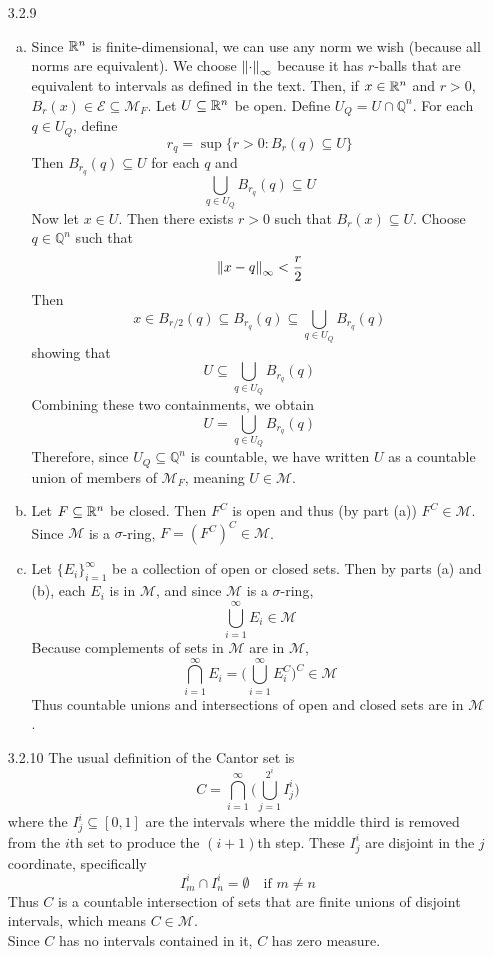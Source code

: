 \documentclass[../../Solutions.tex]{subfiles}
\begin{document}
\begin{itemize}
	\item [3.2.9]
	\begin{enumerate}[(a)]
		\item Since $\mathbb{R}^n$ is finite-dimensional, we can use any norm we wish (because all norms are equivalent).
			We choose $\left\lVert\cdot\right\rVert_\infty$ because it has $r$-balls that are equivalent to intervals as defined in the text.
			Then, if $x \in \mathbb{R}^n$ and $r > 0$, $B_r(x) \in \mathcal{E} \subseteq \mathcal{M}_F$.
			Let $U \subseteq \mathbb{R}^n$ be open.
			Define $U_Q = U\cap\mathbb{Q}^n$.
			For each $q \in U_Q$, define
			$$ r_q = \sup\{r > 0 : B_r(q) \subseteq U \} $$
			Then $B_{r_q}(q) \subseteq U$ for each $q$ and
			$$ \bigcup_{q \in U_Q} B_{r_q}(q) \subseteq U $$
			Now let $x \in U$.
			Then there exists $r > 0$ such that $B_r(x) \subseteq U$.
			Choose $q \in \mathbb{Q}^n$ such that
			$$ \left\lVert x-q\right\rVert_\infty < \frac{r}{2} $$
			Then
			$$ x \in B_{r/2}(q) \subseteq B_{r_q}(q) \subseteq \bigcup_{q \in U_Q} B_{r_q}(q) $$
			showing that
			$$ U \subseteq \bigcup_{q \in U_Q} B_{r_q}(q) $$
			Combining these two containments, we obtain
			$$ U = \bigcup_{q \in U_Q} B_{r_q}(q) $$
			Therefore, since $U_Q \subseteq \mathbb{Q}^n$ is countable, we have written $U$ as a countable union of members of $\mathcal{M}_F$, meaning $U \in \mathcal{M}$.
		\item Let $F \subseteq \mathbb{R}^n$ be closed.
			Then $F^C$ is open and thus (by part (a)) $F^C \in \mathcal{M}$.
			Since $\mathcal{M}$ is a $\sigma$-ring, $F = (F^C)^C \in \mathcal{M}$.
		\item Let $\{E_i\}_{i=1}^\infty$ be a collection of open or closed sets.
			Then by parts (a) and (b), each $E_i$ is in $\mathcal{M}$, and since $\mathcal{M}$ is a $\sigma$-ring,
			$$ \bigcup_{i=1}^\infty E_i \in \mathcal{M} $$
			Because complements of sets in $\mathcal{M}$ are in $\mathcal{M}$,
			$$ \bigcap_{i=1}^\infty E_i = \Big(\bigcup_{i=1}^\infty E_i^C\Big)^C \in \mathcal{M} $$
			Thus countable unions and intersections of open and closed sets are in $\mathcal{M}$.
	\end{enumerate}
	
	\item [3.2.10] The usual definition of the Cantor set is
		$$ C = \bigcap_{i=1}^\infty \Big( \bigcup_{j=1}^{2^i} I^i_j \Big) $$
		where the $I^i_j \subseteq [0,1]$ are the intervals where the middle third is removed from the $i$th set to produce the $(i+1)$th step.
		These $I^i_j$ are disjoint in the $j$ coordinate, specifically
		$$ I^i_m \cap I^i_n = \emptyset \quad\text{if } m \neq n $$
		Thus $C$ is a countable intersection of sets that are finite unions of disjoint intervals, which means $C \in \mathcal{M}$. \\
		Since $C$ has no intervals contained in it, $C$ has zero measure.
	

\end{itemize}
\end{document}
